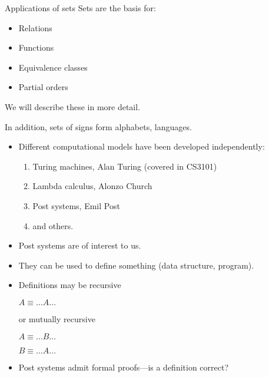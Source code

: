 \documentclass[style=sailor,size=12pt]{powerdot}
\begin{document}
\begin{wideslide}[bm=,toc=]{Applications of sets}
Sets are the basis for:
\begin{itemize}
\item Relations
\item Functions
\item Equivalence classes
\item Partial orders
\end{itemize}
We will describe these in more detail.

In addition, sets of signs form alphabets, languages.



\begin{itemize}
\item Different computational models have been developed independently:
\begin{enumerate}
\item Turing machines, Alan Turing (covered in CS3101)
\item Lambda calculus, Alonzo Church
\item Post systems, Emil Post
\item and others.
\end{enumerate}
\item Post systems are of interest to us.
\item They can be used to define something (data structure, program).
\item Definitions may be recursive 

\hspace{2em}$A \equiv \ldots A\ldots$

or mutually recursive

\hspace{2em}$A \equiv \ldots B\ldots$

\hspace{2em}$B \equiv \ldots A\ldots$

\item Post systems admit formal proofs---is a definition correct?
\end{itemize}
\end{wideslide}
\end{document}
